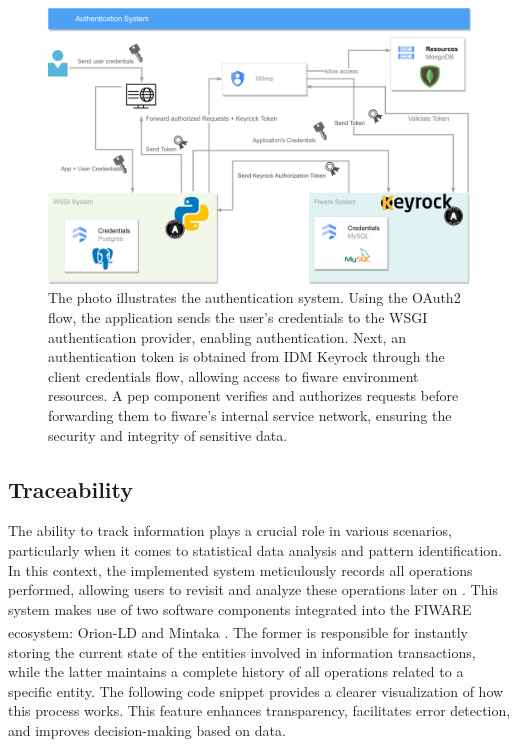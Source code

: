 \begin{figure}[ht!]
    \centering
    \includegraphics[width=.65\linewidth]{images/Development/chap4/oauth.png} 
    \caption{The photo illustrates the authentication system. Using the OAuth2 flow, the application sends the user's credentials to the WSGI authentication provider, enabling authentication. Next, an authentication token is obtained from IDM Keyrock through the client credentials flow, allowing access to \acrshort{fiware} environment resources. A \acrshort{pep} component verifies and authorizes requests before forwarding them to \acrshort{fiware}'s internal service network, ensuring the security and integrity of sensitive data.}
    \label{fig: oauth}
\end{figure}


\subsection{Traceability}\label{section:softwareArchitecture-traceability}

The ability to track information plays a crucial role in various scenarios, particularly when it comes to statistical data analysis and pattern identification. In this context, the implemented system meticulously records all operations performed, allowing users to revisit and analyze these operations later on \cite{Marquesone}. This system makes use of two software components integrated into the FIWARE ecosystem: Orion-LD\textsuperscript{\textregistered} and Mintaka\textsuperscript{\textregistered} \cite{mintaka}. The former is responsible for instantly storing the current state of the entities involved in information transactions, while the latter maintains a complete history of all operations related to a specific entity. The following code snippet provides a clearer visualization of how this process works. This feature enhances transparency, facilitates error detection, and improves decision-making based on data.

